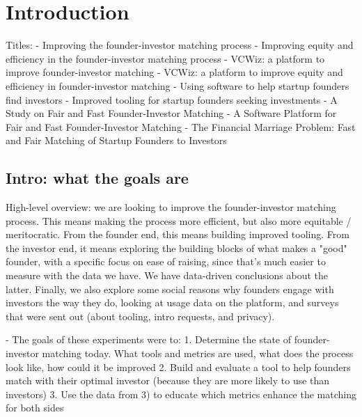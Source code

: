 \chapter{Introduction}


Titles:
  - Improving the founder-investor matching process
  - Improving equity and efficiency in the founder-investor matching process
  - VCWiz: a platform to improve founder-investor matching
  - VCWiz: a platform to improve equity and efficiency in founder-investor matching
  - Using software to help startup founders find investors
  - Improved tooling for startup founders seeking investments
  - A Study on Fair and Fast Founder-Investor Matching
  - A Software Platform for Fair and Fast Founder-Investor Matching
  - The Financial Marriage Problem: Fast and Fair Matching of Startup Founders to Investors

\section{Intro: what the goals are}

High-level overview: we are looking to improve the founder-investor matching process. This means making the process more efficient, but also more equitable / meritocratic. From the founder end, this means building improved tooling. From the investor end, it means exploring the building blocks of what makes a "good" founder, with a specific focus on ease of raising, since that's much easier to measure with the data we have. We have data-driven conclusions about the latter. Finally, we also explore some social reasons why founders engage with investors the way they do, looking at usage data on the platform, and surveys that were sent out (about tooling, intro requests, and privacy).

- The goals of these experiments were to:
  1. Determine the state of founder-investor matching today. What tools and metrics are used, what does the process look like, how could it be improved
  2. Build and evaluate a tool to help founders match with their optimal investor (because they are more likely to use than investors)
  3. Use the data from 3) to educate which metrics enhance the matching for both sides

